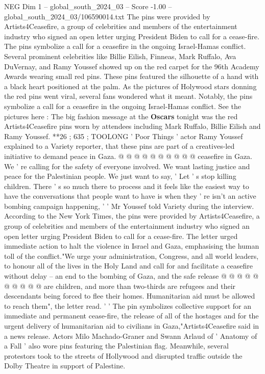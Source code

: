 \begin{textsample}{NEG Dim 1 – global\_south\_2024\_03 – Score -1.00 – global\_south\_2024\_03/106590014.txt}  \label{ex:f1_neg_107}
The pins were provided by Artists4Ceasefire, a group of celebrities and members of the entertainment industry who signed an open letter urging President Biden to call for a cease-fire.
The pins symbolize a call for a ceasefire in the ongoing Israel-Hamas conflict.
Several prominent celebrities like Billie Eilish, Finneas, Mark Ruffalo, Ava DuVernay, and Ramy Youssef showed up on the red carpet for the 96th Academy Awards wearing small red pins.
These pins featured the silhouette of a hand with a black heart positioned at the palm.
As the pictures of Holywood stars donning the red pins went viral, several fans wondered what it meant.
Notably, the pins symbolize a call for a ceasefire in the ongoing Israel-Hamas conflict.
See the pictures here : The big fashion message at the \textbf{Oscars} tonight was the red Artists4Ceasefire pins worn by attendees including Mark Ruffalo, Billie Eilish and Ramy Youssef. **26 ; 635 ; TOOLONG ' Poor Things ' actor Ramy Youssef explained to a Variety reporter, that these pins are part of a creatives-led initiative to demand peace in Gaza. @ @ @ @ @ @ @ @ @ @ ceasefire in Gaza.
We ' re calling for the safety of everyone involved.
We want lasting justice and peace for the Palestinian people.
We just want to say, ' Let ' s stop killing children.
There ' s so much there to process and it feels like the easiest way to have the conversations that people want to have is when they ' re isn't an active bombing campaign happening, ' ' Mr Youssef told Variety during the interview.
According to the New York Times, the pins were provided by Artists4Ceasefire, a group of celebrities and members of the entertainment industry who signed an open letter urging President Biden to call for a cease-fire.
The letter urged immediate action to halt the violence in Israel and Gaza, emphasising the human toll of the conflict."We urge your administration, Congress, and all world leaders, to honour all of the lives in the Holy Land and call for and facilitate a ceasefire without delay -- an end to the bombing of Gaza, and the safe release @ @ @ @ @ @ @ @ @ @ are children, and more than two-thirds are refugees and their descendants being forced to flee their homes.
Humanitarian aid must be allowed to reach them", the letter read. ' ' The pin symbolizes collective support for an immediate and permanent cease-fire, the release of all of the hostages and for the urgent delivery of humanitarian aid to civilians in Gaza,"Artists4Ceasefire said in a news release.
Actors Milo Machado-Graner and Swann Arlaud of ' Anatomy of a Fall ' also wore pins featuring the Palestinian flag.
Meanwhile, several protestors took to the streets of Hollywood and disrupted traffic outside the Dolby Theatre in support of Palestine.

\end{textsample}
